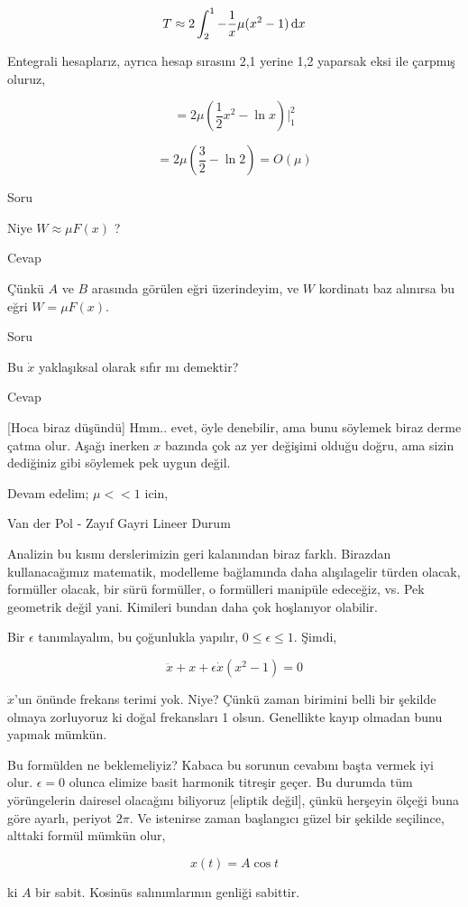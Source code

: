 \documentclass[12pt,fleqn]{article}\usepackage{../../common}
\begin{document}
$$ T \approx 2 \int_{2}^{1} -\frac{1}{x} \mu (x^2-1) \,\mathrm{d} x  $$

Entegrali hesaplarız, ayrıca hesap sırasını 2,1 yerine 1,2 yaparsak eksi ile
çarpmış oluruz,

$$ = 2\mu (\frac{1}{2}x^2 - \ln x) \Big|_{1}^{2} $$

$$ = 2\mu (\frac{3}{2} - \ln 2 ) = O(\mu) $$

Soru

Niye $W \approx \mu F(x)$ ? 

Cevap

Çünkü $A$ ve $B$ arasında görülen eğri üzerindeyim, ve $W$ kordinatı baz
alınırsa bu eğri $W = \mu F(x)$.

Soru

Bu $\dot{x}$ yaklaşıksal olarak sıfır mı demektir?

Cevap

[Hoca biraz düşündü] Hmm.. evet, öyle denebilir, ama bunu söylemek biraz derme
çatma olur. Aşağı inerken $x$ bazında çok az yer değişimi olduğu doğru, ama
sizin dediğiniz gibi söylemek pek uygun değil.

Devam edelim; $\mu << 1$ icin,

Van der Pol - Zayıf Gayri Lineer Durum

Analizin bu kısmı derslerimizin geri kalanından biraz farklı. Birazdan
kullanacağımız matematik, modelleme bağlamında daha alışılagelir türden olacak,
formüller olacak, bir sürü formüller, o formülleri manipüle edeceğiz, vs. Pek
geometrik değil yani. Kimileri bundan daha çok hoşlanıyor olabilir.

Bir $\epsilon$ tanımlayalım, bu çoğunlukla yapılır, $0 \le \epsilon \le
1$. Şimdi,

$$ \ddot{x} + x + \epsilon \dot{x}(x^2 - 1) = 0 $$

$\ddot{x}$'un önünde frekans terimi yok. Niye? Çünkü zaman birimini belli bir
şekilde olmaya zorluyoruz ki doğal frekansları 1 olsun. Genellikte kayıp olmadan
bunu yapmak mümkün. 

Bu formülden ne beklemeliyiz? Kabaca bu sorunun cevabını başta vermek iyi
olur. $\epsilon = 0$ olunca elimize basit harmonik titreşir geçer. Bu durumda
tüm yörüngelerin dairesel olacağını biliyoruz [eliptik değil], çünkü herşeyin
ölçeği buna göre ayarlı, periyot $2\pi$. Ve istenirse zaman başlangıcı güzel bir
şekilde seçilince, alttaki formül mümkün olur, 

$$ x(t) = A \cos t $$

ki $A$ bir sabit. Kosinüs salınımlarının genliği sabittir.
\end{document}
